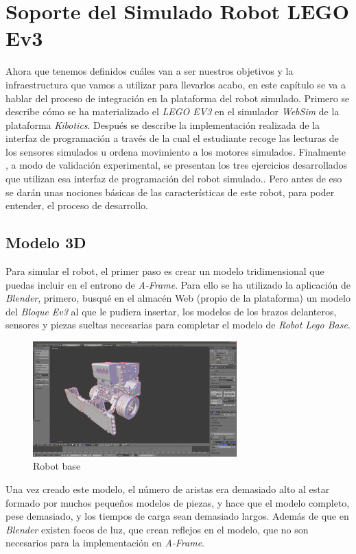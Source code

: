 \chapter{Soporte del Simulado Robot LEGO Ev3}
\label{chap:simulado}
Ahora que tenemos definidos cuáles van a ser nuestros objetivos y la infraestructura que vamos a utilizar para llevarlos acabo, en este capítulo se va a hablar del proceso de integración en la plataforma del robot simulado. Primero se describe cómo se ha materializado el \textit{LEGO EV3} en el simulador \textit{WebSim} de la plataforma \textit{Kibotics}. Después se describe la implementación realizada de la interfaz de programación a través de la cual el estudiante recoge las lecturas de los sensores simulados u ordena movimiento a los motores simulados. Finalmente , a modo de validación experimental, se presentan los tres ejercicios desarrollados que utilizan esa interfaz de programación del robot simulado.. Pero antes de eso se darán unas nociones básicas de las características de este robot, para poder entender, el proceso de desarrollo. 
\section{Modelo 3D}
\label{sec:Modelo}
Para simular el robot, el primer paso es crear un modelo tridimensional que puedas incluir en el entrono de \textit{A-Frame}. Para ello se ha utilizado la aplicación de \textit{Blender}, primero, busqué en el almacén Web (propio de la plataforma) un modelo del \textit{Bloque Ev3} al que le pudiera insertar, los modelos de los brazos delanteros, sensores y piezas sueltas necesarias para completar el modelo de \textit{Robot Lego Base}.

 \begin{figure}[H]
    \centering
    \includegraphics[width=0.7\textwidth]{img/primermodelo.png}
    \caption{Robot base} \label{fig:primer}
\end{figure}

Una vez creado este modelo, el número de aristas era demasiado alto al estar formado por muchos pequeños modelos de piezas, y hace que el modelo completo, pese demasiado, y los tiempos de carga sean demasiado largos. Además de que en \textit{Blender} existen focos de luz, que crean reflejos en el modelo, que no son necesarios para la implementación en \textit{A-Frame}. \newline

